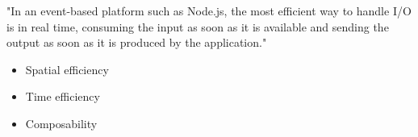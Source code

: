 "In an event-based platform such as Node.js, the most efficient way to handle I/O is in real time, consuming the input as soon as it is available and sending the output as soon as it is produced by the application."\cite{nodejsbook}

\begin{itemize}
	\item Spatial efficiency
	\item Time efficiency
	\item Composability
\end{itemize}




